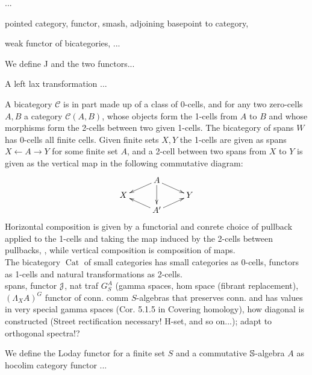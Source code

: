   \begin{defn}\label{def_functor_iW_to_Cat}
    ...
  \end{defn}

  \begin{defn}\label{def_pointed_stuff}
    pointed category, functor, smash, adjoining basepoint to category,
  \end{defn}

  \begin{defn}\label{def_added_basepoint_extending_functor}
    weak functor of bicategories, ...
  \end{defn}

  \begin{defn}\label{def_J_and_functors_from_finite_sets_to_pointed_categories}
    We define J and the two functors...
  \end{defn}

  \begin{defn}\label{def_left_lax_transformation}
    A left lax transformation ...
  \end{defn}

  A bicategory $\mathcal{C}$ is in part made up of a class of 0-cells, and for any two zero-cells $A,B$ a category $\mathcal{C}(A,B)$, whose objects form the 1-cells from $A$ to $B$ and whose morphisms form the 2-cells between two given 1-cells. The bicategory of spans $W$ has 0-cells all finite cells. Given finite sets $X,Y$ the 1-cells are given as spans $ X \leftarrow A \rightarrow Y$ for some finite set $A$, and a 2-cell between two spans from $X$ to $Y$  is given as the vertical map in the following commutative diagram:
  \[
  \xymatrix@R-=.5em{
    &
    A \ar[dl] \ar[dd] \ar[dr]
    \\
    X
    &
    &
    Y
    \\
    &
    A^\prime \ar[ul] \ar[ur]
    &
  }
  \]
  Horizontal composition is given by a functorial and conrete choice of pullback applied to the 1-cells and taking the map induced by the 2-cells between pullbacks, , while vertical composition is composition of maps.\\
  The bicategory $\operatorname{Cat}$ of small categories has small categories as 0-cells, functors as 1-cells and natural transformations as 2-cells.
  \\
  spans, functor $\mathcal{J}$, nat traf $G^A_S$ (gamma spaces, hom space (fibrant replacement), $(\Lambda_X A)^G$ functor of conn. comm $S$-algebras that preserves conn. and has values in very special gamma spaces (Cor. 5.1.5 in Covering homology), how diagonal is constructed (Street rectification necessary! H-set, and so on...); adapt to orthogonal spectra!?
  \begin{defn}\label{def_loday_functor}
    We define the Loday functor for a finite set $S$ and a commutative $\mathbb{S}$-algebra $A$ as hocolim category functor ...

  \end{defn}

